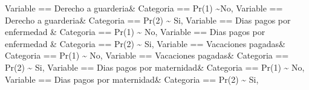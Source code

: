\documentclass[
]{article}
\newenvironment{Shaded}{\begin{snugshade}}{\end{snugshade}}
\newcommand{\NormalTok}[1]{#1}
\newcommand{\SpecialCharTok}[1]{\textcolor[rgb]{0.00,0.00,0.00}{#1}}
\newcommand{\StringTok}[1]{\textcolor[rgb]{0.31,0.60,0.02}{#1}}
\begin{document}
\begin{Shaded}
\begin{Highlighting}[]
\NormalTok{         Variable }\SpecialCharTok{==} \StringTok{\textquotesingle{}Derecho a guarderia\textquotesingle{}}\SpecialCharTok{\&}\NormalTok{ Categoria }\SpecialCharTok{==} \StringTok{\textquotesingle{}Pr(1)\textquotesingle{}} \SpecialCharTok{\textasciitilde{}}\StringTok{\textquotesingle{}No\textquotesingle{}}\NormalTok{,}
\NormalTok{         Variable }\SpecialCharTok{==} \StringTok{\textquotesingle{}Derecho a guarderia\textquotesingle{}}\SpecialCharTok{\&}\NormalTok{ Categoria }\SpecialCharTok{==} \StringTok{\textquotesingle{}Pr(2)\textquotesingle{}} \SpecialCharTok{\textasciitilde{}} \StringTok{\textquotesingle{}Si\textquotesingle{}}\NormalTok{,}
\NormalTok{         Variable }\SpecialCharTok{==} \StringTok{\textquotesingle{}Dias pagos por enfermedad\textquotesingle{}} \SpecialCharTok{\&}\NormalTok{ Categoria }\SpecialCharTok{==} \StringTok{\textquotesingle{}Pr(1)\textquotesingle{}} \SpecialCharTok{\textasciitilde{}} \StringTok{\textquotesingle{}No\textquotesingle{}}\NormalTok{,}
\NormalTok{         Variable }\SpecialCharTok{==} \StringTok{\textquotesingle{}Dias pagos por enfermedad\textquotesingle{}} \SpecialCharTok{\&}\NormalTok{ Categoria }\SpecialCharTok{==} \StringTok{\textquotesingle{}Pr(2)\textquotesingle{}} \SpecialCharTok{\textasciitilde{}} \StringTok{\textquotesingle{}Si\textquotesingle{}}\NormalTok{,}
\NormalTok{         Variable }\SpecialCharTok{==} \StringTok{\textquotesingle{}Vacaciones pagadas\textquotesingle{}}\SpecialCharTok{\&}\NormalTok{ Categoria }\SpecialCharTok{==} \StringTok{\textquotesingle{}Pr(1)\textquotesingle{}} \SpecialCharTok{\textasciitilde{}} \StringTok{\textquotesingle{}No\textquotesingle{}}\NormalTok{,}
\NormalTok{         Variable }\SpecialCharTok{==} \StringTok{\textquotesingle{}Vacaciones pagadas\textquotesingle{}}\SpecialCharTok{\&}\NormalTok{ Categoria }\SpecialCharTok{==} \StringTok{\textquotesingle{}Pr(2)\textquotesingle{}} \SpecialCharTok{\textasciitilde{}} \StringTok{\textquotesingle{}Si\textquotesingle{}}\NormalTok{,}
\NormalTok{         Variable }\SpecialCharTok{==} \StringTok{\textquotesingle{}Dias pagos por maternidad\textquotesingle{}}\SpecialCharTok{\&}\NormalTok{ Categoria }\SpecialCharTok{==} \StringTok{\textquotesingle{}Pr(1)\textquotesingle{}} \SpecialCharTok{\textasciitilde{}} \StringTok{\textquotesingle{}No\textquotesingle{}}\NormalTok{,}
\NormalTok{         Variable }\SpecialCharTok{==} \StringTok{\textquotesingle{}Dias pagos por maternidad\textquotesingle{}}\SpecialCharTok{\&}\NormalTok{ Categoria }\SpecialCharTok{==} \StringTok{\textquotesingle{}Pr(2)\textquotesingle{}} \SpecialCharTok{\textasciitilde{}} \StringTok{\textquotesingle{}Si\textquotesingle{}}\NormalTok{,}

\end{Highlighting}
\end{Shaded}
\end{document}
